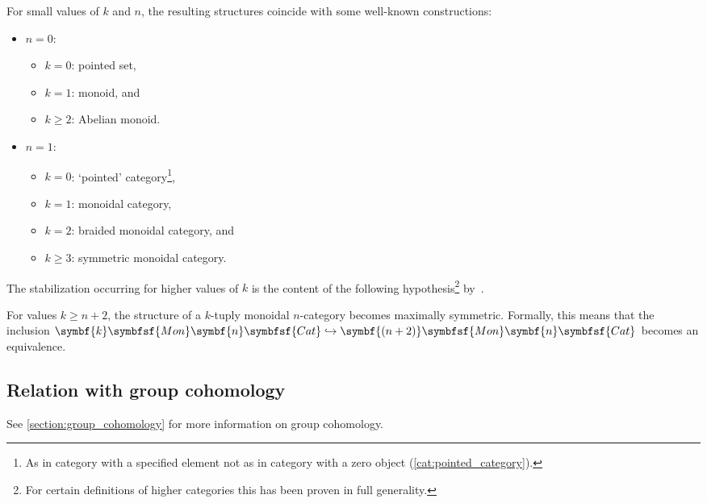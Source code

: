     \begin{example}
        For small values of $k$ and $n$, the resulting structures coincide with some well-known constructions:
        \begin{itemize}
            \item $n=0$:
                \begin{itemize}
                    \item $k=0$: pointed set,
                    \item $k=1$: monoid, and
                    \item $k\geq2$: Abelian monoid.
                \end{itemize}
            \item $n=1$:
                \begin{itemize}
                    \item $k=0$: `pointed' category\footnote{As in category with a specified element not as in category with a zero object (\cref{cat:pointed_category}).},
                    \item $k=1$: monoidal category,
                    \item $k=2$: braided monoidal category, and
                    \item $k\geq3$: symmetric monoidal category.
                \end{itemize}
        \end{itemize}
    \end{example}
    The stabilization occurring for higher values of $k$ is the content of the following hypothesis\footnote{For certain definitions of higher categories this has been proven in full generality.} by~\citet{baez_higherdimensional_1995}.
    \begin{theorem}
        For values $k\geq n+2$, the structure of a $k$-tuply monoidal $n$-category becomes maximally symmetric. Formally, this means that the inclusion \emph{$\symbf{k}\symbfsf{Mon}\symbf{n}\symbfsf{Cat}\hookrightarrow\symbf{(n+2)}\symbfsf{Mon}\symbf{n}\symbfsf{Cat}$} becomes an equivalence.
    \end{theorem}

\subsection{Relation with group cohomology}\label{section:hda_group_cohomology}

    See \cref{section:group_cohomology} for more information on group cohomology.

